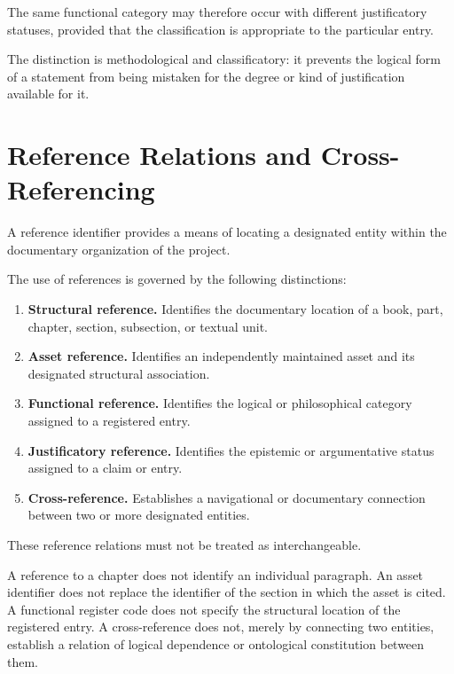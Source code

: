 The same functional category may therefore occur with
different justificatory statuses, provided that the
classification is appropriate to the particular entry.

The distinction is methodological and classificatory:
it prevents the logical form of a statement from being
mistaken for the degree or kind of justification
available for it.



\section*{Reference Relations and Cross-Referencing}

A reference identifier provides a means of locating
a designated entity within the documentary organization
of the project.

The use of references is governed by the following
distinctions:

\begin{enumerate}
    \item \textbf{Structural reference.}
          Identifies the documentary location of a book,
          part, chapter, section, subsection, or textual unit.

    \item \textbf{Asset reference.}
          Identifies an independently maintained asset
          and its designated structural association.

    \item \textbf{Functional reference.}
          Identifies the logical or philosophical category
          assigned to a registered entry.

    \item \textbf{Justificatory reference.}
          Identifies the epistemic or argumentative status
          assigned to a claim or entry.

    \item \textbf{Cross-reference.}
          Establishes a navigational or documentary
          connection between two or more designated entities.
\end{enumerate}

These reference relations must not be treated as
interchangeable.

A reference to a chapter does not identify an individual
paragraph. An asset identifier does not replace the
identifier of the section in which the asset is cited.
A functional register code does not specify the structural
location of the registered entry. A cross-reference
does not, merely by connecting two entities, establish
a relation of logical dependence or ontological constitution
between them.

